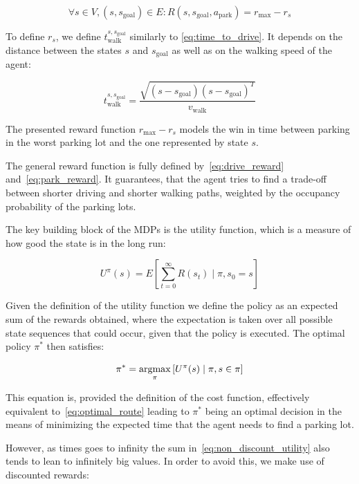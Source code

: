 \begin{equation}
\label{eq:park_reward}
\forall s \in V, (s, s_{\mathrm{goal}}) \in E : R(s, s_{\mathrm{goal}}, a_{\mathrm{park}}) = r_{\max} - r_s
\end{equation}

To define $r_s$, we define $t_{\mathrm{walk}}^{s,s_{\mathrm{goal}}}$ similarly
to \eqref{eq:time_to_drive}. It depends on the distance between the states $s$ and $s_\mathrm{goal}$ as well as on the walking speed of the agent:

\begin{equation}
t_{\mathrm{walk}}^{s,s_{\mathrm{goal}}} = \frac{\sqrt{(s -
s_{\mathrm{goal}}) {(s - s_{\mathrm{goal}})}^T}}{v_{\mathrm{walk}}}
\end{equation}

The presented reward function $r_{\max} - r_s$ models the win in time between
parking in the worst parking lot and the one represented by state $s$.

The general reward function is fully defined by~\eqref{eq:drive_reward}
and~\eqref{eq:park_reward}. It guarantees, that the agent tries to find a
trade-off between shorter driving and shorter walking paths, weighted by the
occupancy probability of the parking lots.

The key building block of the MDPs is the utility function, which is a measure
of how good the state is in the long run:

\begin{equation}
\label{eq:non_discount_utility}
U^{\pi}(s) = E\left[\sum_{t=0}^{\infty} R(s_t) \mid \pi,s_0 = s \right]
\end{equation}

Given the definition of the utility function we define the policy as an
expected sum of the rewards obtained, where the expectation is taken over all
possible state sequences that could occur, given that the policy is executed.
The optimal policy $\pi^*$ then satisfies:

\begin{equation}
\label{eq:optimal_policy}
\pi^* = \mathop{\rm argmax}_\pi \left[ U^{\pi}(s) \mid \pi, s \in \pi \right]
\end{equation}

This equation is, provided the definition of the cost function, effectively
equivalent to~\eqref{eq:optimal_route} leading to $\pi^*$ being an optimal
decision in the means of minimizing the expected time that the agent needs to
find a parking lot.

However, as times goes to infinity the sum in~\eqref{eq:non_discount_utility}
also tends to lean to infinitely big values. In order to avoid this, we make
use of discounted rewards:

